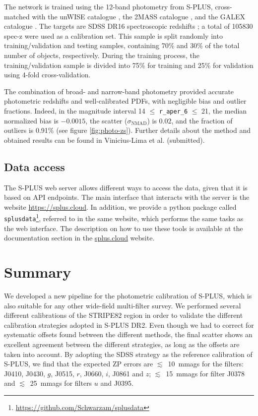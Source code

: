 \documentclass[fleqn,usenatbib]{mnras}
\begin{document}
The network is trained using the 12-band photometry from S-PLUS, cross-matched with the unWISE catalogue \citep[][for the W1 and W2 magnitudes]{schlafly2019unwise}, the 2MASS catalogue \citep[][J, H, and K magnitudes]{cutri20032mass}, and the GALEX catalogue \citep[][FUV and NUV magnitudes]{bianchi2017galex}. The targets are SDSS DR16 spectroscopic redshifts \citep[see, for example,][]{du2020completed}; a total of 105830 spec-z were used as a calibration set. This sample is split randomly into training/validation and testing samples, containing 70\% and 30\% of the total number of objects, respectively. During the training process, the  training/validation sample is divided into 75\% for training and 25\% for validation using 4-fold cross-validation.

The combination of broad- and narrow-band photometry provided accurate photometric redshifts and well-calibrated PDFs, with negligible bias and outlier fractions. Indeed, in the magnitude interval 14 $\leqslant$ \texttt{r\_aper\_6} $\leqslant$ 21, the median normalized bias is $-0.0015$, the scatter ($\sigma_\text{NMAD}$) is 0.02, and the fraction of outliers is 0.91\% (see figure \ref{fig:photo-zs}). Further details about the method and obtained results can be found in Vinicius-Lima et al. (submitted).


\subsection{Data access}
The S-PLUS web server allows different ways to access the data, given that it is based on API endpoints. The main interface that interacts with the server is the website \href{https://splus.cloud}{https://splus.cloud}. In addition, we provide a python package called \texttt{splusdata}\footnote{\href{https://github.com/Schwarzam/splusdata}{https://github.com/Schwarzam/splusdata}}, referred to in the same website, which performs the same tasks as the web interface. The description on how to use these tools is available at the documentation section in the \href{https://splus.cloud}{splus.cloud} website.

\section{Summary}
\label{sec::Summary}

We developed a new pipeline for the photometric calibration of S-PLUS, which is also suitable for any other wide-field multi-filter survey. We performed several different calibrations of the STRIPE82 region in order to validate the different calibration strategies adopted in S-PLUS DR2. Even though we had to correct for systematic offsets found between the different methods, the final scatter shows an excellent agreement between the different strategies, as long as the offsets are taken into account. By adopting the SDSS strategy as the reference calibration of S-PLUS, we find that the expected ZP errors are $\lesssim$~10~mmags for the filters: J0410, J0430, $g$, J0515, $r$, J0660, $i$, J0861 and $z$; $\lesssim$~15~mmags for filter J0378 and $\lesssim$~25~mmags for filters $u$ and J0395.
\end{document}
